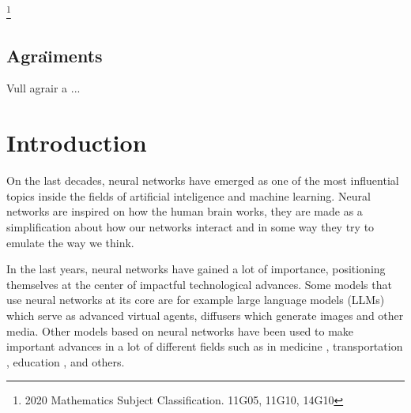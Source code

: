 \documentclass[11pt,a4paper,openright,oneside]{book}
\numberwithin{equation}{section}
\begin{document}
{\let\thefootnote\relax\footnote{2020 Mathematics Subject Classification. 11G05, 11G10, 14G10}}



\newpage 


\section*{Agra\"{\i}ments}

Vull agrair a ... 
\newpage

{\hypersetup{linkcolor=black}
\tableofcontents
}

\newpage

\setcounter{page}{1}
\chapter{Introduction}


On the last decades, neural networks have emerged as one of the most influential topics inside the fields of
artificial inteligence and machine learning. Neural networks are inspired on how the human brain works, they are 
made as a simplification about how our networks interact and in some way they try to emulate the way we think.

In the last years, neural networks have gained a lot of importance, positioning themselves at the center of
impactful technological advances. Some models that use neural networks at its core are
for example large language models (LLMs) which serve as advanced virtual agents, diffusers which
generate images and other media. Other models based on neural networks have been used to make important
advances in a lot of different fields such as in medicine \cite{mengApplicationLargeLanguage2024},
transportation \cite{nieExploringRolesLarge2025}, 
education \cite{abd-alrazaqLargeLanguageModels2023}, and others.
\end{document}
